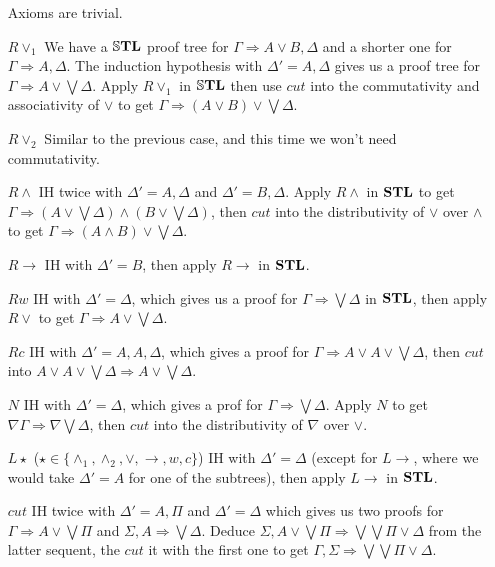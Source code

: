 \documentclass[a4paper, 12pt]{paper}
\begin{document}
\begin{enumerate}
  \item[Axioms] are trivial.
  \item[$R \vee_1$] We have a $\mathbb{S}\mathbf{TL}$ proof tree for $\Gamma \Rightarrow A \vee B, \Delta$ and a shorter one for $\Gamma \Rightarrow A, \Delta$. The induction hypothesis with $\Delta' = A, \Delta$ gives us a proof tree for $\Gamma \Rightarrow A \vee \bigvee \Delta$. Apply $R \vee_1$ in $\mathbb{S}\mathbf{TL}$ then use $cut$ into the commutativity and associativity of $\vee$ to get $\Gamma \Rightarrow (A \vee B) \vee \bigvee \Delta$.
  \item[$R \vee_2$] Similar to the previous case, and this time we won't need commutativity.
  \item[$R \wedge$] IH twice with $\Delta' = A, \Delta$ and $\Delta' = B, \Delta$. Apply $R \wedge$ in $\mathbf{STL}$ to get $\Gamma \Rightarrow (A \vee \bigvee \Delta) \wedge (B \vee \bigvee \Delta)$, then $cut$ into the distributivity of $\vee$ over $\wedge$ to get $\Gamma \Rightarrow (A \wedge B) \vee \bigvee \Delta$.
  \item[$R \rightarrow$] IH with $\Delta' = B$, then apply $R \rightarrow$ in $\mathbf{STL}$.
  \item[$R w$] IH with $\Delta' = \Delta$, which gives us a proof for $\Gamma \Rightarrow \bigvee \Delta$ in $\mathbf{STL}$, then apply $R \vee$ to get $\Gamma \Rightarrow A \vee \bigvee \Delta$.
  \item[$R c$] IH with $\Delta' = A, A, \Delta$, which gives a proof for $\Gamma \Rightarrow A \vee A \vee \bigvee \Delta$, then $cut$ into $A \vee A \vee \bigvee \Delta \Rightarrow A \vee \bigvee \Delta$.
  \item[$N$] IH with $\Delta' = \Delta$, which gives a prof for $\Gamma \Rightarrow \bigvee \Delta$. Apply $N$ to get $\nabla \Gamma \Rightarrow \nabla \bigvee \Delta$, then $cut$ into the distributivity of $\nabla$ over $\vee$.
  \item[$L \star$] ($\star \in \{ \wedge_1, \wedge_2, \vee, \rightarrow, w, c \}$) IH with $\Delta' = \Delta$ (except for $L \rightarrow$, where we would take $\Delta' = A$ for one of the subtrees), then apply $L \rightarrow$ in $\mathbf{STL}$.
  \item[$cut$] IH twice with $\Delta' = A, \Pi$ and $\Delta' = \Delta$ which gives us two proofs for $\Gamma \Rightarrow A \vee \bigvee \Pi$ and $\Sigma, A \Rightarrow \bigvee \Delta$. Deduce $\Sigma, A \vee \bigvee \Pi \Rightarrow \bigvee \bigvee \Pi \vee \Delta$ from the latter sequent, the $cut$ it with the first one to get $\Gamma, \Sigma \Rightarrow \bigvee \bigvee \Pi \vee \Delta$.
\end{enumerate}
\end{document}

